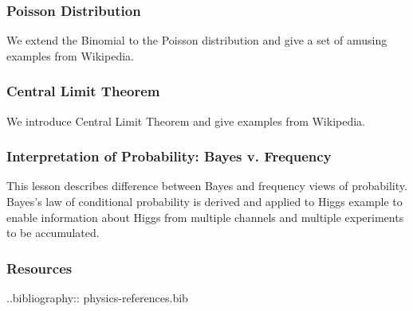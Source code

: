 
\subsubsection{Poisson Distribution}\label{poisson-distribution}

We extend the Binomial to the Poisson distribution and give a set of
amusing examples from Wikipedia.


\subsubsection{Central Limit Theorem}\label{central-limit-theorem}

We introduce Central Limit Theorem and give examples from Wikipedia.


\subsubsection{Interpretation of Probability: Bayes v.
Frequency}\label{interpretation-of-probability-bayes-v.-frequency}

This lesson describes difference between Bayes and frequency views of
probability. Bayes's law of conditional probability is derived and
applied to Higgs example to enable information about Higgs from multiple
channels and multiple experiments to be accumulated.


\subsubsection{Resources}\label{resources-3}

..bibliography:: physics-references.bib
